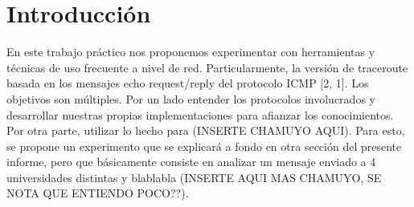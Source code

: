 \section{Introducción}

En este trabajo práctico nos proponemos experimentar con herramientas y técnicas de uso frecuente a
nivel de red. Particularmente, la versión de traceroute basada en los mensajes echo request/reply del
protocolo ICMP [2, 1]. Los objetivos son múltiples. Por un lado entender los protocolos involucrados y
desarrollar nuestras propias implementaciones para afianzar los conocimientos. Por otra parte, utilizar lo hecho para (INSERTE CHAMUYO AQUI). Para esto, se propone un experimento que se explicará a fondo en otra sección del presente informe, pero que básicamente consiste en analizar un mensaje enviado a 4 universidades distintas y blablabla (INSERTE AQUI MAS CHAMUYO, SE NOTA QUE ENTIENDO POCO??).